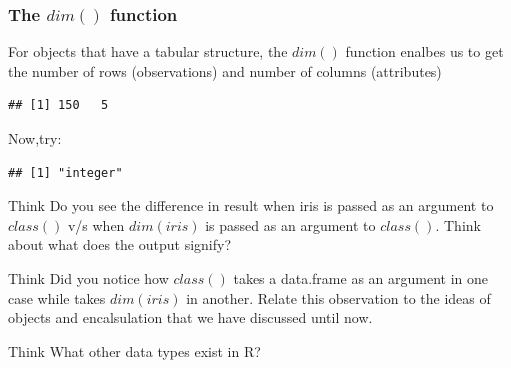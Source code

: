 \subsubsection{The $dim()$ function}
\noindent For objects that have a tabular structure, the $dim()$ function enalbes us to get the number of rows (observations) and number of columns (attributes)  
\begin{knitrout}
\color{fgcolor}\begin{kframe}
\begin{alltt}
\end{alltt}
\begin{verbatim}
## [1] 150   5
\end{verbatim}
\end{kframe}
\end{knitrout}
\noindent Now,try:
\begin{knitrout}
\color{fgcolor}\begin{kframe}
\begin{alltt}
\hlstd{(}
\end{alltt}
\begin{verbatim}
## [1] "integer"
\end{verbatim}
\end{kframe}
\end{knitrout}
\begin{DIY}{Think}
Do you see the difference in result when iris is passed as an argument to $class()$ v/s when $dim(iris)$ is passed as an argument to $class()$. Think about what does the output signify?   
\end{DIY}

\begin{DIY}{Think}
Did you notice how $class()$ takes a data.frame as an argument in one case while takes $dim(iris)$ in another. Relate this observation to the ideas of objects and encalsulation that we have discussed until now.   
\end{DIY}

\begin{DIY}{Think}
What other data types exist in R?   
\end{DIY}

